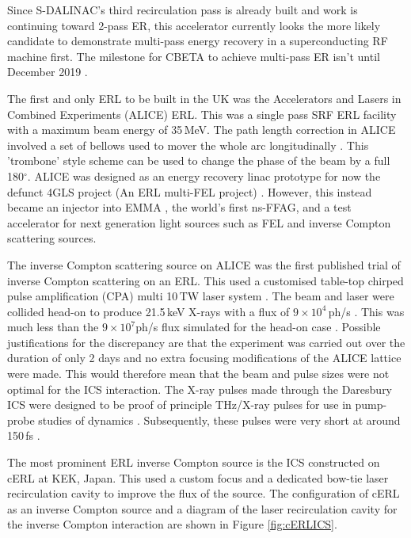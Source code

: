 \documentclass[11pt]{article}
\begin{document}
Since S-DALINAC's third recirculation pass is already built and work is continuing toward 2-pass ER, this accelerator currently looks the more likely candidate to demonstrate multi-pass energy recovery in a superconducting RF machine first. The milestone for CBETA to achieve multi-pass ER isn't until December 2019 \cite{CBETATDR}.

\vspace{5mm}

The first and only ERL to be built in the UK was the Accelerators and Lasers in Combined Experiments (ALICE) ERL. This was a single pass SRF ERL facility with a maximum beam energy of 35\,MeV. The path length correction in ALICE involved a set of bellows used to mover the whole arc longitudinally \cite{HywelPetepath}. This 'trombone' style scheme can be used to change the phase of the beam by a full 180$^{\circ}$.  ALICE was designed as an energy recovery linac prototype \cite{ALICE2012IPAC} for now the defunct 4GLS project (An ERL multi-FEL project) \cite{4GLS}. However, this instead became an injector into EMMA \cite{EMMAnature}, the world's first ns-FFAG, and a test accelerator for next generation light sources such as FEL and inverse Compton scattering sources.    

The inverse Compton scattering source on ALICE was the first published trial of inverse Compton scattering on an ERL. This used a customised table-top chirped pulse amplification (CPA) multi 10\,TW laser system \cite{ALICEICS1}. The beam and laser were collided head-on to produce 21.5\,keV X-rays with a flux of $9\times10^{4}$\,ph/s \cite{ALICEICS1}. This was much less than the $9\times10^{7}$ph/s flux simulated for the head-on case \cite{ALICEICS2}. Possible justifications for the discrepancy are that the experiment was carried out over the duration of only 2 days and no extra focusing modifications of the ALICE lattice were made. This would therefore mean that the beam and pulse sizes were not optimal for the ICS interaction. The X-ray pulses made through the Daresbury ICS were designed to be proof of principle THz/X-ray pulses for use in pump-probe studies of dynamics \cite{ALICEICS1}. Subsequently, these pulses were very short at around 150\,fs \cite{ALICEICS1}.

\vspace{5mm}

The most prominent ERL inverse Compton source is the ICS constructed on cERL at KEK, Japan. This used a custom focus and a dedicated bow-tie laser recirculation cavity to improve the flux of the source. The configuration of cERL as an inverse Compton source and a diagram of the laser recirculation cavity for the inverse Compton interaction are shown in Figure \ref{fig:cERLICS}.
\end{document}
